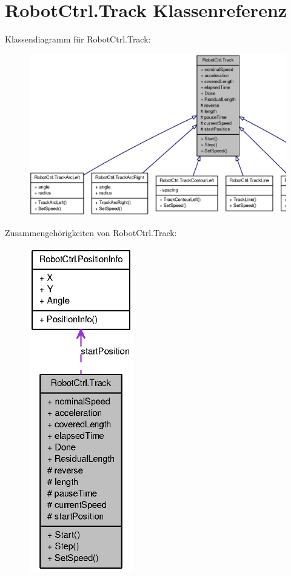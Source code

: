 \hypertarget{class_robot_ctrl_1_1_track}{
\section{RobotCtrl.Track Klassenreferenz}
\label{class_robot_ctrl_1_1_track}
}


Klassendiagramm für RobotCtrl.Track:\nopagebreak
\begin{figure}[H]
\begin{center}
\leavevmode
\includegraphics[width=400pt]{class_robot_ctrl_1_1_track__inherit__graph}
\end{center}
\end{figure}


Zusammengehörigkeiten von RobotCtrl.Track:\nopagebreak
\begin{figure}[H]
\begin{center}
\leavevmode
\includegraphics[height=400pt]{class_robot_ctrl_1_1_track__coll__graph}
\end{center}
\end{figure}
